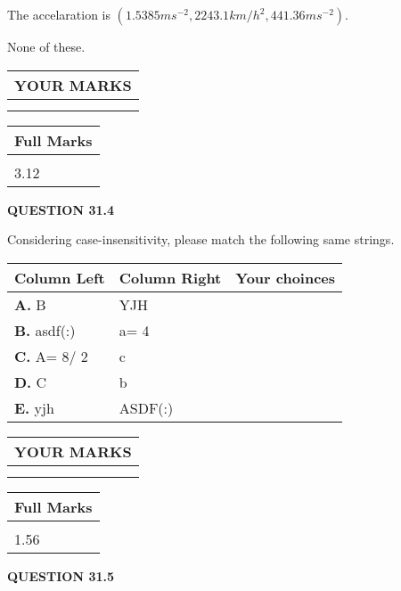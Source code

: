 \documentclass[12pt]{article}
\begin{document}
 
The accelaration is
$(
1.5385ms^{-2},
2243.1km/h^2,
441.36ms^{-2}
).
$
 
 
 None of these.
 
 
 
 

 
\vspace{0.3in}
  
\vspace{0.2in}
  
\noindent\begin{tabular}{|l|}
\hline
 YOUR MARKS  \\
\hline
 \\ 
 \\ 
\hline
\end{tabular}
\hspace{0.05in} \begin{tabular}{|l|}
\hline
 Full Marks  \\
\hline
 \\ 
3.12 \\
\hline
\end{tabular}
{\textbf{\Large{QUESTION
31.4 
}}}
  
  
Considering case-insensitivity, please match the following same strings.
  
  
\begin{tabular}{|l|l|l|}
 \hline
 Column Left & Column Right  & Your choinces \\ 
 \hline
{\textbf{\large{
A.}}}
B
  & 
YJH
 & 
 \\ 
 \hline
{\textbf{\large{
B.}}}
asdf(:)
  & 
 a= %
4
 & 
 \\ 
 \hline
{\textbf{\large{
C.}}}
 A= %
8/ %
2

  & 
c
 & 
 \\ 
 \hline
{\textbf{\large{
D.}}}
C
  & 
b
 & 
 \\ 
 \hline
{\textbf{\large{
E.}}}
yjh
  & 
ASDF(:)
 & 
 \\ 
 \hline
 \end{tabular}
  
  
 
  
\vspace{0.2in}
  
\noindent\begin{tabular}{|l|}
\hline
 YOUR MARKS  \\
\hline
 \\ 
 \\ 
\hline
\end{tabular}
\hspace{0.05in} \begin{tabular}{|l|}
\hline
 Full Marks  \\
\hline
 \\ 
1.56 \\
\hline
\end{tabular}
{\textbf{\Large{QUESTION
31.5 
}}}
  
\end{document}
